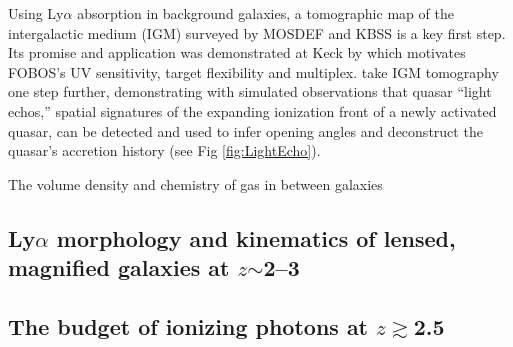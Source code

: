 Using Ly$\alpha$ absorption in background galaxies, a tomographic map of the intergalactic medium (IGM) surveyed by MOSDEF and KBSS is a key first step.  Its promise and application was demonstrated at Keck by \citet{lee14} which motivates FOBOS's UV sensitivity, target flexibility and multiplex.  \citet{2018arXiv181005156S} take IGM tomography one step further, demonstrating with simulated observations that quasar ``light echos,'' spatial signatures of the expanding ionization front of a newly activated quasar, can be detected and used to infer opening angles and deconstruct the quasar's accretion history (see Fig \ref{fig:LightEcho}).  

The volume density and chemistry of gas in between galaxies
\noindent{}


\subsection{Ly$\alpha$ morphology and kinematics of lensed, magnified
galaxies at $z$$\sim$2--3}

\noindent{}

\subsection{The budget of ionizing photons at $z$$\gtrsim$2.5}

\noindent{}


%
%
%
%

